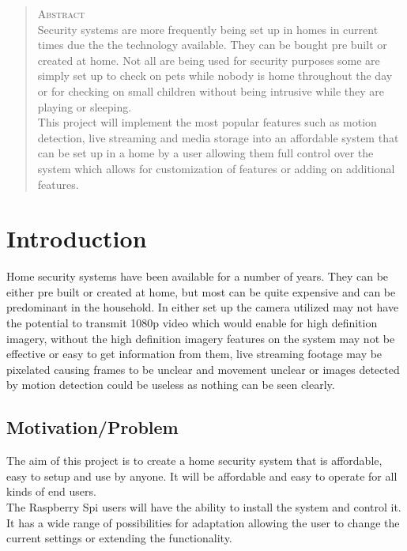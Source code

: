 \documentclass[12pt]{report}
\begin{document}
\begin{abstract}
\textsc{\huge Abstract}  \\[1.0cm]
Security systems are more frequently being set up in homes in current times due the the technology available. They can be bought pre built or created at home. Not all are being used for security purposes some are simply set up to check on pets while nobody is home throughout the day or for checking on small children without being intrusive while they are playing or sleeping.\\

This project will implement the most popular features such as motion detection, live streaming and media storage into an affordable system that can be set up  in a home by a user allowing them full control over the system which allows for customization of features or adding on additional features.\\
\end{abstract}

\tableofcontents
\chapter{Introduction}
\label{ch:intro} 

Home security systems have been available for a number of years. They can be either pre built or created at home, but most can be quite expensive and can be predominant in the household. In either set up the camera utilized may not have the potential to transmit 1080p video which would enable for high definition imagery, without the high definition imagery features on the system may not be effective or easy to get information from them, live streaming footage may be pixelated causing frames to be unclear and movement unclear or images detected by motion detection could be useless as nothing can be seen clearly.

\section{Motivation/Problem}
\label{sec:motprob}
The aim of this project is to create a home security system that is affordable, easy to setup and use by anyone. It will be affordable and easy to operate for all kinds of end users.\\

The Raspberry Spi  users will have the ability to install the system and control it.  It has a wide range of possibilities for adaptation allowing the user to change the current settings or extending the functionality.\\
\end{document}
